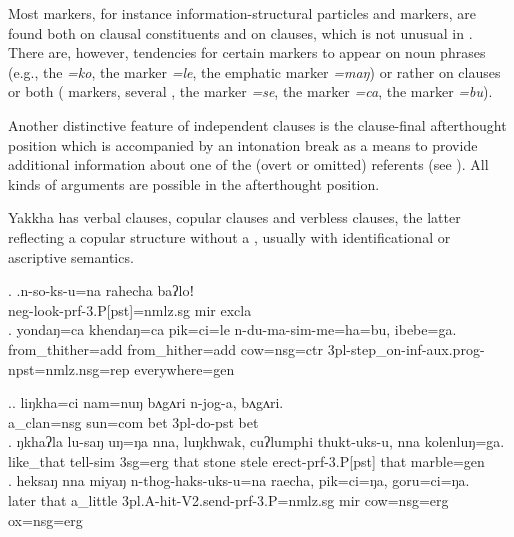  Most markers, for instance information-structural particles and  markers, are found  both on clausal constituents and on clauses, which is not unusual in . There are, however, tendencies for certain markers to appear on noun phrases (e.g., the  \emph{=ko}, the  marker \emph{=le}, the emphatic marker \emph{=maŋ}) or rather on clauses or both ( markers, several , the  marker \emph{=se}, the  marker \emph{=ca}, the  marker \emph{=bu}). 
 
 Another distinctive feature of independent clauses is the clause-final afterthought position which is accompanied by an intonation break as a means to provide additional information about one of the (overt or omitted) referents (see \NNext). All kinds of arguments are possible in the afterthought position. 
 
 Yakkha has verbal clauses, copular clauses and verbless clauses, the latter  reflecting a copular structure without a , usually with identificational or ascriptive semantics.

 \ex. \ag.n-so-ks-u=na                           rahecha baʔloǃ\\
 {\sc neg-}look{\sc -prf-3.P[pst]=nmlz.sg} {\sc mir} {\sc excla}\\
  
  \bg. yondaŋ=ca           khendaŋ=ca         pik=ci=le        n-du-ma-sim-me=ha=bu,           ibebe=ga.\\
 from\_thither{\sc =add} from\_hither{\sc =add} cow{\sc =nsg=ctr} {\sc 3pl-}step\_on{\sc -inf-aux.prog-npst=nmlz.nsg=rep} everywhere{\sc =gen}\\
   

 \ex.\ag. liŋkha=ci nam=nuŋ bʌgʌri n-jog-a,  bʌgʌri.\\
 	a\_clan{\sc =nsg} sun{\sc =com}   bet    {\sc 3pl-}do{\sc -pst} bet\\
 	 
 \bg.  ŋkhaʔla   lu-saŋ        uŋ=ŋa   nna,  luŋkhwak, cuʔlumphi thukt-uks-u,           nna  kolenluŋ=ga.\\
 like\_that tell{\sc -sim} {\sc 3sg=erg} that stone stele erect{\sc -prf-3.P[pst]} that marble{\sc =gen}\\
  
\bg. heksaŋ nna  miyaŋ n-thog-haks-uks-u=na     raecha, pik=ci=ŋa,      goru=ci=ŋa.\\
later that a\_little {\sc 3pl.A-}hit{\sc -V2.send-prf-3.P=nmlz.sg} {\sc mir} cow{\sc =nsg=erg} ox{\sc =nsg=erg}\\
 

